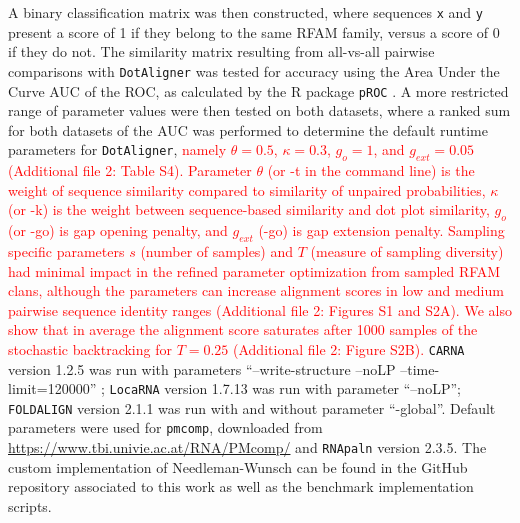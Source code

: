 \documentclass{bmcart}
\newcommand\dotaligner{\texttt{DotAligner}}
\newcommand\locarna{\texttt{LocaRNA}}
\newcommand\foldalign{\texttt{FOLDALIGN}}
\newcommand\carna{\texttt{CARNA}}
\begin{document}
A binary classification matrix was then constructed, where sequences \texttt{x} and \texttt{y}
present a score of 1 if they belong to the same RFAM family, versus a score of 0 if they do not. 
The similarity matrix resulting from all-vs-all pairwise comparisons with \dotaligner{} was tested for 
accuracy using the Area Under the Curve AUC of the ROC, as calculated by the R package \texttt{pROC} \cite{robin2011proc}. 
A more restricted range of parameter values were then tested on both datasets, where a ranked sum for both datasets of the AUC was performed to determine the default runtime parameters for \dotaligner, 
\textcolor{red}{
namely $\theta=0.5$, $\kappa=0.3$, $g_o=1$, and $g_{ext}=0.05$ (Additional file 2: Table S4). Parameter $\theta$ (or -t in the command line) is the weight of sequence similarity compared to similarity of unpaired probabilities, $\kappa$ (or -k) is the weight between sequence-based similarity and dot plot similarity, $g_o$ (or -go) is gap opening penalty, and $g_{ext}$ (-go) is gap extension penalty.
Sampling specific parameters $s$ (number of samples) and $T$ (measure of sampling diversity) had minimal impact 
in the refined parameter optimization from sampled RFAM clans, although the parameters can increase alignment scores in low and medium pairwise sequence identity ranges (Additional file 2: Figures S1 and S2A). We also show that in average the alignment score saturates after 1000 samples of the stochastic backtracking  for $T=0.25$ (Additional file 2: Figure S2B). }
\carna{} version 1.2.5 was run with parameters ``--write-structure --noLP --time-limit=120000'' ;  \locarna{} version 1.7.13 was run with parameter ``--noLP''; \foldalign{} version 2.1.1 was run with and without parameter ``-global''. Default parameters were used for \texttt{pmcomp}, downloaded from \url{https://www.tbi.univie.ac.at/RNA/PMcomp/} and \texttt{RNApaln} version 2.3.5. The custom implementation of Needleman-Wunsch can be found in the GitHub repository associated to this work as well as the benchmark implementation scripts. \\
\end{document}
